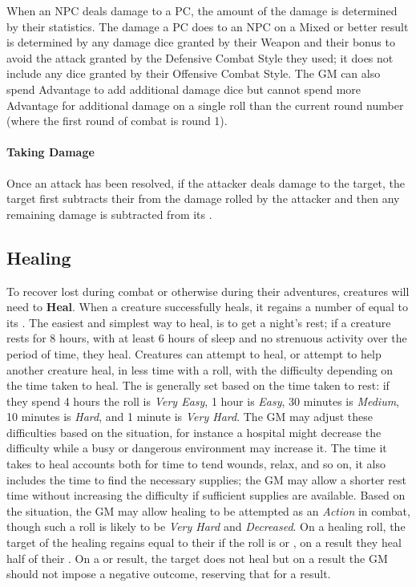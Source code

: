 When an NPC deals damage to a PC, the amount of the damage is determined by their statistics.
The damage a PC does to an NPC on a Mixed or better result is determined by any damage dice granted by their Weapon and their bonus to avoid the attack granted by the Defensive Combat Style they used; it does not include any dice granted by their Offensive Combat Style.
The GM can also spend Advantage to add additional damage dice but cannot spend more Advantage for additional damage on a single roll than the current round number (where the first round of combat is round 1).

\paragraph{Taking Damage}
Once an attack has been resolved, if the attacker deals damage to the target, the target first subtracts their \Block{} from the damage rolled by the attacker and then any remaining damage is subtracted from its \Life{}.

\subsection{Healing}
To recover \Life{} lost during combat or otherwise during their adventures, creatures will need to \textbf{Heal}.
When a creature successfully heals, it regains a number of \Life{} equal to its \Recovery{}.
The easiest and simplest way to heal, is to get a night's rest; if a creature rests for 8 hours, with at least 6 hours of sleep and no strenuous activity over the period of time, they heal.
Creatures can attempt to heal, or attempt to help another creature heal, in less time with a roll, with the difficulty depending on the time taken to heal.
The \Difficulty{} is generally set based on the time taken to rest: if they spend 4 hours the roll is \emph{Very Easy}, 1 hour is \emph{Easy}, 30 minutes is \emph{Medium}, 10 minutes is \emph{Hard}, and 1 minute is \emph{Very Hard}.
The GM may adjust these difficulties based on the situation, for instance a hospital might decrease the difficulty while a busy or dangerous environment may increase it.
The time it takes to heal accounts both for time to tend wounds, relax, and so on, it also includes the time to find the necessary supplies; the GM may allow a shorter rest time without increasing the difficulty if sufficient supplies are available.
Based on the situation, the GM may allow healing to be attempted as an \emph{Action} in combat, though such a roll is likely to be \emph{Very Hard} and \emph{Decreased}.
On a healing roll, the target of the healing regains \Life{} equal to their \Recovery{} if the roll is \Good{} or \VeryGood{}, on a \Mixed{} result they heal half of their \Recovery{}.
On a \Bad{} or \VeryBad{} result, the target does not heal but on a \Bad{} result the GM should not impose a negative outcome, reserving that for a \VeryBad{} result.

